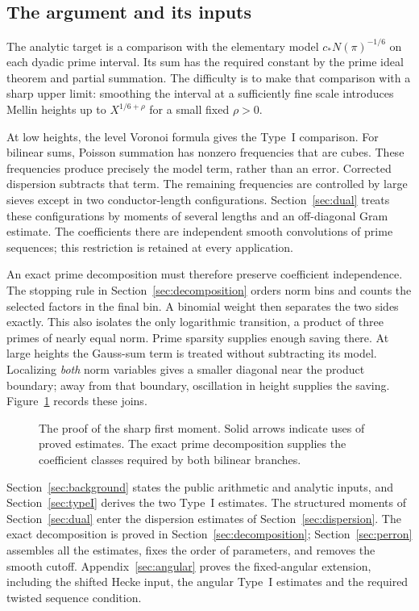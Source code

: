 \documentclass[11pt]{article}
\theoremstyle{definition}
\theoremstyle{remark}
\numberwithin{equation}{section}
\begin{document}
\subsection{The argument and its inputs}
The analytic target is a comparison with the elementary model
$c_*N(\pi)^{-1/6}$ on each dyadic prime interval. Its sum has the
required constant by the prime ideal theorem and partial summation.
The difficulty is to make that comparison with a sharp upper limit:
smoothing the interval at a sufficiently fine scale introduces Mellin
heights up to $X^{1/6+\rho}$ for a small fixed $\rho>0$.

At low heights, the level Voronoi formula gives the Type~I comparison.
For bilinear sums, Poisson summation has nonzero frequencies that are
cubes. These frequencies produce precisely the model term, rather than
an error. Corrected dispersion subtracts that term. The remaining
frequencies are controlled by large sieves except in two conductor-length
configurations. Section~\ref{sec:dual} treats these configurations by
moments of several lengths and an off-diagonal Gram estimate. The
coefficients there are independent smooth convolutions of prime
sequences; this restriction is retained at every application.

An exact prime decomposition must therefore preserve coefficient
independence. The stopping rule in Section~\ref{sec:decomposition}
orders norm bins and counts the selected factors in the final bin.
A binomial weight then separates the two sides exactly. This also
isolates the only logarithmic transition, a product of three primes
of nearly equal norm. Prime sparsity supplies enough saving there.
At large heights the Gauss-sum term is treated without subtracting its
model. Localizing \emph{both} norm variables gives a smaller diagonal
near the product boundary; away from that boundary, oscillation in
height supplies the saving. Figure~\ref{fig:proof-map} records these joins.

\begin{figure}[ht]
\centering

\caption{The proof of the sharp first moment. Solid arrows indicate
uses of proved estimates. The exact prime decomposition supplies the
coefficient classes required by both bilinear branches.}
\label{fig:proof-map}
\end{figure}

Section~\ref{sec:background} states the public arithmetic and analytic
inputs, and Section~\ref{sec:typeI} derives the two Type~I estimates.
The structured moments of Section~\ref{sec:dual} enter the dispersion
estimates of Section~\ref{sec:dispersion}. The exact decomposition is
proved in Section~\ref{sec:decomposition};
Section~\ref{sec:perron} assembles all the estimates, fixes the order of
parameters, and removes the smooth cutoff.
Appendix~\ref{sec:angular} proves the fixed-angular extension, including
the shifted Hecke input, the angular Type~I estimates and the required
twisted sequence condition.
\end{document}
